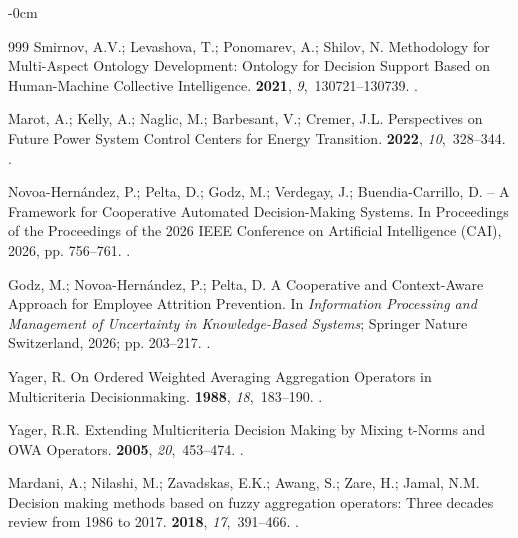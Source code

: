 \documentclass[mathematics,article,submit,moreauthors]{Definitions/mdpi}
\begin{document}
\begin{adjustwidth}{-\extralength}{0cm}
\begin{thebibliography}{999}
Smirnov, A.V.; Levashova, T.; Ponomarev, A.; Shilov, N.
\newblock Methodology for Multi-Aspect Ontology Development: Ontology for Decision Support Based on Human-Machine Collective Intelligence.
 {\bf 2021}, {\em 9},~130721--130739.
.

Marot, A.; Kelly, A.; Naglic, M.; Barbesant, V.; Cremer, J.L.
\newblock Perspectives on Future Power System Control Centers for Energy Transition.
 {\bf 2022}, {\em 10},~328--344.
.

Novoa-Hernández, P.; Pelta, D.; Godz, M.; Verdegay, J.; Buendia-Carrillo, D.
 – A Framework for Cooperative Automated Decision-Making Systems.
\newblock In Proceedings of the Proceedings of the 2026 IEEE Conference on Artificial Intelligence (CAI),  2026, pp. 756--761.
.

Godz, M.; Novoa-Hernández, P.; Pelta, D.
\newblock A Cooperative and Context-Aware Approach for Employee Attrition Prevention. In {\em Information Processing and Management of Uncertainty in Knowledge-Based Systems}; Springer Nature Switzerland,  2026; pp. 203--217.
.

Yager, R.
\newblock On Ordered Weighted Averaging Aggregation Operators in Multicriteria Decisionmaking.
 {\bf 1988}, {\em 18},~183--190.
.

Yager, R.R.
\newblock Extending Multicriteria Decision Making by Mixing t-Norms and {OWA} Operators.
 {\bf 2005}, {\em 20},~453--474.
.

Mardani, A.; Nilashi, M.; Zavadskas, E.K.; Awang, S.; Zare, H.; Jamal, N.M.
\newblock Decision making methods based on fuzzy aggregation operators: Three decades review from 1986 to 2017.
 {\bf 2018}, {\em 17},~391--466.
.


\end{thebibliography}
\end{adjustwidth}
\end{document}
